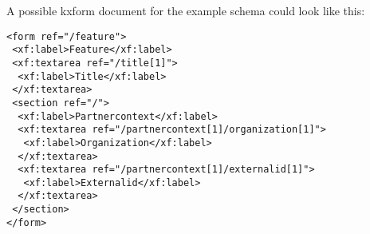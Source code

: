 \begin{description}
A possible kxform document for the example schema could look like this:


\begin{lstlisting}[caption=Example KXForms Document]
<form ref="/feature">
 <xf:label>Feature</xf:label>
 <xf:textarea ref="/title[1]">
  <xf:label>Title</xf:label>
 </xf:textarea>
 <section ref="/">
  <xf:label>Partnercontext</xf:label>
  <xf:textarea ref="/partnercontext[1]/organization[1]">
   <xf:label>Organization</xf:label>
  </xf:textarea>
  <xf:textarea ref="/partnercontext[1]/externalid[1]">
   <xf:label>Externalid</xf:label>
  </xf:textarea>
 </section>
</form>
\end{lstlisting}

\end{description}



